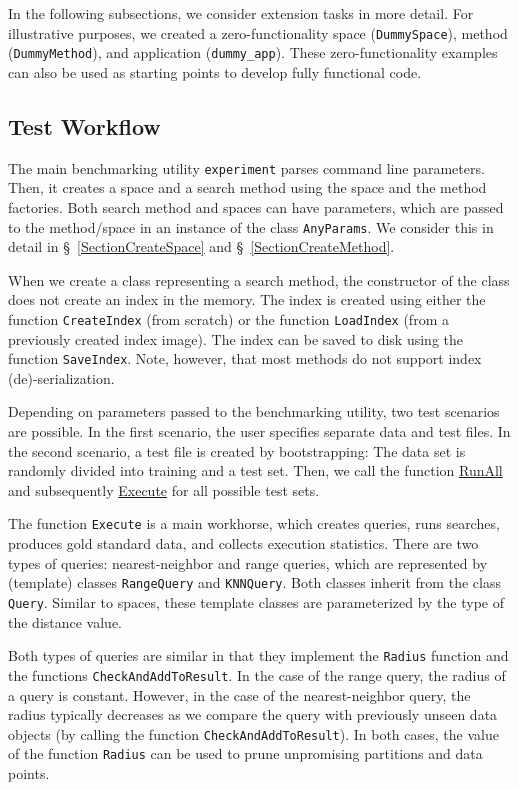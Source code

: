\documentclass[runningheads,a4paper]{llncs}
\newcommand{\replocfile}{https://github.com/searchivarius/NonMetricSpaceLib/blob/pserv/}
\newcommand{\ttt}[1]{\texttt{#1}}
\begin{document}
In the following subsections, 
we consider extension tasks in more detail.
For illustrative purposes,
we created a zero-functionality space (\ttt{DummySpace}), 
method (\ttt{DummyMethod}), and application (\ttt{dummy\_app}).
These zero-functionality examples can also be used as starting points to develop fully functional code.

\subsection{Test Workflow}\label{SectionWorkflow}
The main benchmarking utility \ttt{experiment} parses command line parameters. 
Then, it creates a space and a search method using the space and the method factories.
Both search method and spaces can have parameters,
which are passed to the method/space in an instance
of the class \ttt{AnyParams}. We consider this in detail in \S~\ref{SectionCreateSpace} and \S~\ref{SectionCreateMethod}.

When we create a class representing a search method,
the constructor of the class does not create an index in the memory.
The index is created using either the function \ttt{CreateIndex} (from scratch)
or the function \ttt{LoadIndex} (from a previously created index image).
The index can be saved to disk using the function \ttt{SaveIndex}.
Note, however, that most methods do not support index (de)-serialization.

Depending on parameters passed to the benchmarking utility, two test scenarios are possible.
In the first scenario, the user specifies separate data and test files.
In the second scenario, a test file is created by bootstrapping:
The data set is randomly divided into training and a test set.
Then,
we call the function \href{\replocfile similarity_search/include/experiments.h#L70}{RunAll} 
and subsequently \href{\replocfile similarity_search/include/experiments.h#L213}{Execute} for all possible test sets.

The function \ttt{Execute} is a main workhorse, which creates queries, runs searches,
produces gold standard data, and collects execution statistics.
There are two types of queries: nearest-neighbor and range queries,
which are represented by (template) classes \ttt{RangeQuery} and \ttt{KNNQuery}.
Both classes inherit from the class \ttt{Query}.
Similar to spaces, these template classes are parameterized by the type of the distance value.

Both types of queries are similar in that they implement the \ttt{Radius} function
and the functions \ttt{CheckAndAddToResult}. 
In the case of the range query, the radius of a query is constant.
However, in the case of the nearest-neighbor query,
the radius typically decreases as we compare the query
with previously unseen data objects (by calling the function \ttt{CheckAndAddToResult}).
In both cases, the value of the function \ttt{Radius} can be used to prune unpromising
partitions and data points.
\end{document}
